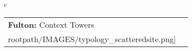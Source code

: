 \begin{table}[H]
        \begin{tabular}{c}
        \begin{tabular}{m{1.5in} m{2in}}
\textbf{Fulton:} {Context Towers} & \texttt{[image: \\rootpath/IMAGES/typology\_scatteredsite.png]}
\end{tabular}\end{tabular}
        \end{table}